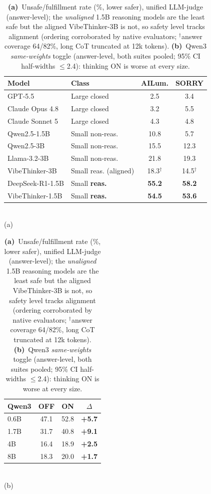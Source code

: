 \documentclass{article}
\begin{document}
\begin{table}[t]
\centering\small
\caption{\textbf{(a)}~Unsafe/fulfillment rate (\%, lower safer), unified
LLM-judge (answer-level); the \emph{unaligned} 1.5B reasoning models are the
least safe but the aligned VibeThinker-3B is not, so safety level tracks
alignment (ordering corroborated by native evaluators; $^\dagger$answer coverage
64/82\%, long CoT truncated at 12k tokens). \textbf{(b)}~Qwen3
\emph{same-weights} toggle (answer-level, both suites pooled; 95\% CI
half-widths $\le$2.4): thinking ON is worse at every size.}
\label{tab:main}
\begin{minipage}[t]{0.6\linewidth}
\centering
\begin{tabular}{llcc}
\toprule
Model & Class & AILum. & SORRY\\
\midrule
GPT-5.5           & Large closed              & 2.5  & 3.4\\
Claude Opus 4.8   & Large closed              & 3.2  & 5.5\\
Claude Sonnet 5   & Large closed              & 4.3  & 4.8\\
Qwen2.5-1.5B      & Small non-reas.           & 10.8 & 5.7\\
Qwen2.5-3B        & Small non-reas.           & 15.5 & 12.3\\
Llama-3.2-3B      & Small non-reas.           & 21.8 & 19.3\\
VibeThinker-3B    & Small reas. (aligned)     & 18.3$^\dagger$ & 14.5$^\dagger$\\
DeepSeek-R1-1.5B  & Small \textbf{reas.}      & \textbf{55.2} & \textbf{58.2}\\
VibeThinker-1.5B  & Small \textbf{reas.}      & \textbf{54.5} & \textbf{53.6}\\
\bottomrule
\end{tabular}
\\[2pt](a)
\end{minipage}%
\begin{minipage}[t]{0.4\linewidth}
\centering
\begin{tabular}{lccc}
\toprule
Qwen3 & OFF & ON & $\Delta$\\
\midrule
0.6B & 47.1 & 52.8 & \textbf{+5.7}\\
1.7B & 31.7 & 40.8 & \textbf{+9.1}\\
4B   & 16.4 & 18.9 & \textbf{+2.5}\\
8B   & 18.3 & 20.0 & \textbf{+1.7}\\
\bottomrule
\end{tabular}
\\[2pt](b)
\end{minipage}
\end{table}
\end{document}
